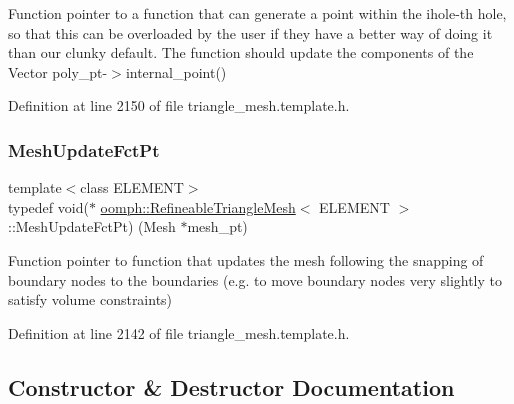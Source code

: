 Function pointer to a function that can generate a point within the ihole-\/th hole, so that this can be overloaded by the user if they have a better way of doing it than our clunky default. The function should update the components of the Vector poly\+\_\+pt-\/$>$internal\+\_\+point() 



Definition at line 2150 of file triangle\+\_\+mesh.\+template.\+h.

\mbox{\label{classoomph_1_1RefineableTriangleMesh_aa78ffa56b66a1371aec25e25f7aaff9e}} 
\subsubsection{\texorpdfstring{Mesh\+Update\+Fct\+Pt}{MeshUpdateFctPt}}
{\footnotesize\ttfamily template$<$class E\+L\+E\+M\+E\+NT$>$ \\
typedef void($\ast$ \hyperlink{classoomph_1_1RefineableTriangleMesh}{oomph\+::\+Refineable\+Triangle\+Mesh}$<$ E\+L\+E\+M\+E\+NT $>$\+::Mesh\+Update\+Fct\+Pt) (Mesh $\ast$mesh\+\_\+pt)}



Function pointer to function that updates the mesh following the snapping of boundary nodes to the boundaries (e.\+g. to move boundary nodes very slightly to satisfy volume constraints) 



Definition at line 2142 of file triangle\+\_\+mesh.\+template.\+h.



\subsection{Constructor \& Destructor Documentation}
\mbox{\label{classoomph_1_1RefineableTriangleMesh_a8285dea563df94b4e450e283088da6d6}} 
